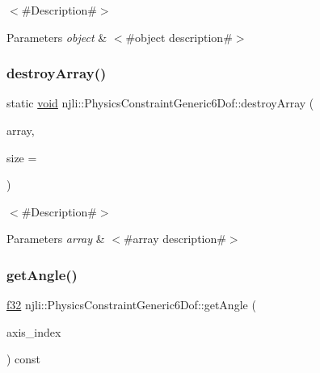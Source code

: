 $<$\#\+Description\#$>$


\begin{DoxyParams}{Parameters}
{\em object} & $<$\#object description\#$>$ \\
\hline
\end{DoxyParams}
\mbox{\label{classnjli_1_1_physics_constraint_generic6_dof_a5c3c7a6da2d13eccde2f45ac66624cb8}} 
\subsubsection{\texorpdfstring{destroy\+Array()}{destroyArray()}}
{\footnotesize\ttfamily static \mbox{\hyperlink{_thread_8h_af1e856da2e658414cb2456cb6f7ebc66}{void}} njli\+::\+Physics\+Constraint\+Generic6\+Dof\+::destroy\+Array (\begin{DoxyParamCaption}\item[{\mbox{\hyperlink{classnjli_1_1_physics_constraint_generic6_dof}{Physics\+Constraint\+Generic6\+Dof}} $\ast$$\ast$}]{array,  }\item[{const \mbox{\hyperlink{_util_8h_a10e94b422ef0c20dcdec20d31a1f5049}{u32}}}]{size = {} }\end{DoxyParamCaption})\hspace{0.3cm}{\ttfamily [static]}}

$<$\#\+Description\#$>$


\begin{DoxyParams}{Parameters}
{\em array} & $<$\#array description\#$>$ \\
\hline
\end{DoxyParams}
\mbox{\label{classnjli_1_1_physics_constraint_generic6_dof_ae933d3bad2ab5614a25c8afbc79eda7a}} 
\subsubsection{\texorpdfstring{get\+Angle()}{getAngle()}}
{\footnotesize\ttfamily \mbox{\hyperlink{_util_8h_a5f6906312a689f27d70e9d086649d3fd}{f32}} njli\+::\+Physics\+Constraint\+Generic6\+Dof\+::get\+Angle (\begin{DoxyParamCaption}\item[{int}]{axis\+\_\+index }\end{DoxyParamCaption}) const}

